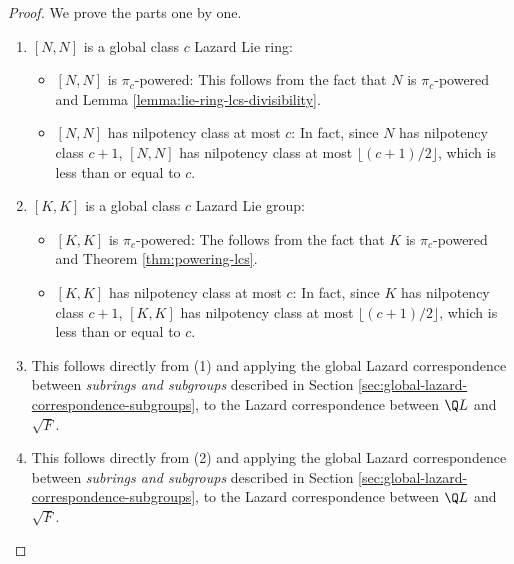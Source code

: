\documentclass{ucetd}
\begin{document}
\begin{proof}
  We prove the parts one by one.

  \begin{enumerate}
  \item $[N,N]$ is a global class $c$ Lazard Lie ring: 
    \begin{itemize}
    \item $[N,N]$ is $\pi_c$-powered: This follows from the fact that
      $N$ is $\pi_c$-powered and Lemma
      \ref{lemma:lie-ring-lcs-divisibility}.
    \item $[N,N]$ has nilpotency class at most $c$: In fact, since $N$
      has nilpotency class $c + 1$, $[N,N]$ has nilpotency class at
      most $\lfloor (c + 1)/2 \rfloor$, which is less than or equal to
      $c$.
    \end{itemize}
  \item $[K,K]$ is a global class $c$ Lazard Lie group:
    
    \begin{itemize}
    \item $[K,K]$ is $\pi_c$-powered: The follows from the fact that
      $K$ is $\pi_c$-powered and Theorem \ref{thm:powering-lcs}.
    \item $[K,K]$ has nilpotency class at most $c$: In fact, since $K$
      has nilpotency class $c + 1$, $[K,K]$ has nilpotency class at
      most $\lfloor (c + 1)/2 \rfloor$, which is less than or equal to
      $c$.
    \end{itemize}

  \item This follows directly from (1) and applying the global Lazard
    correspondence between {\em subrings and subgroups} described in
    Section \ref{sec:global-lazard-correspondence-subgroups}, to the
    Lazard correspondence between $\Q L$ and $\sqrt{F}$.
  \item This follows directly from (2) and applying the global Lazard
    correspondence between {\em subrings and subgroups} described in
    Section \ref{sec:global-lazard-correspondence-subgroups}, to the
    Lazard correspondence between $\Q L$ and $\sqrt{F}$.
  \end{enumerate}
\end{proof}
\end{document}
